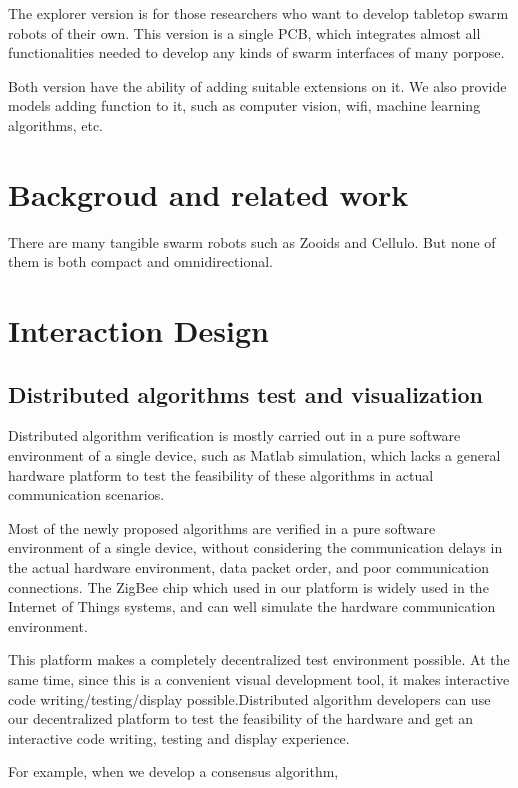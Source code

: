\documentclass[sigconf]{acmart}
\begin{document}
The explorer version is for those researchers who want to develop tabletop swarm robots of their own. This version is a single PCB, which integrates almost all functionalities needed to develop any kinds of swarm interfaces of many porpose.

Both version have the ability of adding suitable extensions on it. We also provide models adding function to it, such as computer vision, wifi, machine learning algorithms, etc.

\section{Backgroud and related work}

There are many tangible swarm robots such as Zooids\cite{le2016zooids} and Cellulo\cite{ozgur2017cellulo}. But none of them is both compact and omnidirectional.

\section{Interaction Design}

\subsection{Distributed algorithms test and visualization}

Distributed algorithm verification is mostly carried out in a pure software environment of a single device, such as Matlab simulation, which lacks a general hardware platform to test the feasibility of these algorithms in actual communication scenarios.

Most of the newly proposed algorithms are verified in a pure software environment of a single device, without considering the communication delays in the actual hardware environment, data packet order, and poor communication connections. The ZigBee chip which used in our platform is widely used in the Internet of Things systems, and can well simulate the hardware communication environment.

This platform makes a completely decentralized test environment possible. At the same time, since this is a convenient visual development tool, it makes interactive code writing/testing/display possible.Distributed algorithm developers can use our decentralized platform to test the feasibility of the hardware and get an interactive code writing, testing and display experience.

For example, when we develop a consensus algorithm, 
\end{document}
